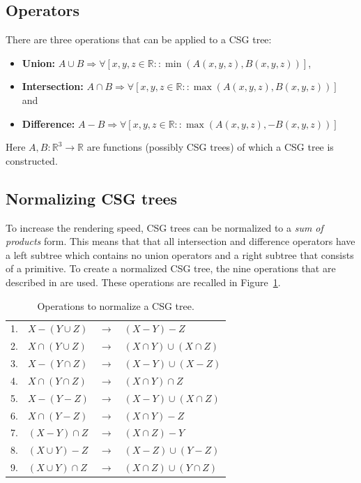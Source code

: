 \documentclass[a4paper,10pt,twoside]{report}
\begin{document}
\subsection{Operators}
    There are three operations that can be applied to a CSG tree:
    \begin{itemize}
        \item[] \hspace{-2.5em}\textbf{Union: }$A \cup B \Rightarrow \forall[x,y,z \in \mathbb{R} :: \min(A(x, y, z), B(x,y,z))]$,
        \item[] \hspace{-2.5em}\textbf{Intersection: }$A \cap B \Rightarrow \forall[x,y,z \in \mathbb{R} :: \max(A(x, y, z), B(x,y,z))]$ and
        \item[] \hspace{-2.5em}\textbf{Difference: }$A - B \Rightarrow \forall[x,y,z \in \mathbb{R} :: \max(A(x, y, z), -B(x, y, z))]$
    \end{itemize}
    Here $A, B:\mathbb{R}^3 \rightarrow \mathbb{R}$ are functions (possibly CSG trees) of which a CSG tree is constructed.
    
\subsection{Normalizing CSG trees}
    To increase the rendering speed, CSG trees can be normalized to a \textit{sum of products} form. This means that that all intersection and difference operators have a left subtree which contains no union operators and a right subtree that consists of a primitive. To create a normalized CSG tree, the nine operations that are described in \cite{Wiegand96} are used. These operations are recalled in Figure~\ref{table:normalize}.\\
    \begin{table}[h]
        \begin{longtable}{llll}
            1. & $X - (Y \cup Z)$    & $\rightarrow$ & $(X - Y) - Z$\\
            2. & $X \cap (Y \cup Z)$ & $\rightarrow$ & $(X \cap Y) \cup (X \cap Z)$\\
            3. & $X - (Y \cap Z)$    & $\rightarrow$ & $(X - Y) \cup (X - Z)$\\
            4. & $X \cap (Y \cap Z)$ & $\rightarrow$ & $(X \cap Y) \cap Z$\\
            5. & $X - (Y - Z)$       & $\rightarrow$ & $(X - Y) \cup (X \cap Z)$\\
            6. & $X \cap (Y - Z)$    & $\rightarrow$ & $(X \cap Y) - Z$\\
            7. & $(X - Y) \cap Z$    & $\rightarrow$ & $(X \cap Z) - Y$\\
            8. & $(X \cup Y) - Z$    & $\rightarrow$ & $(X - Z) \cup (Y - Z)$\\
            9. & $(X \cup Y) \cap Z$ & $\rightarrow$ & $(X \cap Z) \cup (Y \cap Z)$\\
        \end{longtable}
        \caption{Operations to normalize a CSG tree.}
        \label{table:normalize}
    \end{table}
    
\end{document}
